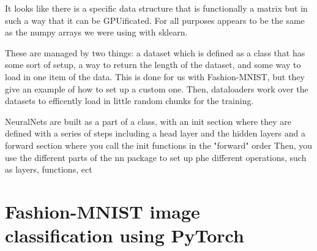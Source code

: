 It looks like there is a specific data structure that is functionally a matrix but in such a way that it can be GPUificated.
For all purposes appears to be the same as the numpy arrays we were using with sklearn.

These are managed by two things: a dataset which is defined as a class that has some sort of setup, a way to return the length of the dataset, and some way to load in one item of the data.
This is done for us with Fashion-MNIST, but they give an example of how to set up a custom one.
Then, dataloaders work over the datasets to efficently load in little random chunks for the training.

NeuralNets are built as a part of a class, with an init section where they are defined with a series of steps including a head layer and the hidden layers and a forward section where you call the init functions in the "forward" order
Then, you use the different parts of the nn package to set up phe different operations, such as layers, functions, ect






\section{Fashion-MNIST image classification  using PyTorch}





